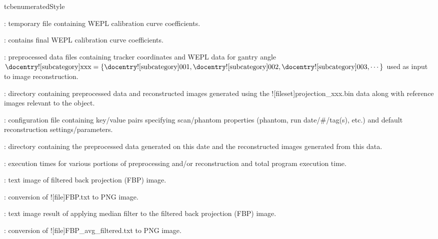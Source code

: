\begin{tcbenvironment}
\begin{tcbparbox}{tcbenumeratedStyle}
\begin{ThinEnum}
\begin{ThinEnum}
\begin{ThinEnum}
\begin{ThinEnum}
\begin{ThinEnum}
\begin{ThinEnum}
\begin{ThinEnum}
                        \item {} : temporary file containing WEPL calibration curve coefficients.
                                    \item {} : contains final WEPL calibration curve coefficients.
                                    \item {} : preprocessed data files containing tracker coordinates and WEPL data for gantry angle $\text{\docentry![subcategory]{xxx}} =\{\text{\docentry![subcategory]{001}}, \text{\docentry![subcategory]{002}}, \text{\docentry![subcategory]{003}}, \cdots\}$ used as input to image reconstruction.
                        \item {} : directory containing preprocessed data and reconstructed images generated using the \docentry![fileset]{projection\_xxx.bin} data along with reference images relevant to the object.
                                    \begin{ThinEnum}
                                        \item {} : configuration file containing key/value pairs specifying scan/phantom properties (phantom, run date/\#/tag(s), etc.) and default reconstruction settings/parameters.
                                    \item {} : directory containing the preprocessed data generated on this date and the reconstructed images generated from this data.
                                    \begin{ThinEnum}
                                            \item {} : execution times for various portions of preprocessing and/or reconstruction and total program execution time.
                                            \item {} : text image of filtered back projection (FBP) image.
                                            \item {} : conversion of \docentry![file]{FBP.txt} to PNG image.
                                            \item {} : text image result of applying median filter to the filtered back projection (FBP) image.
                                            \item {} : conversion of \docentry![file]{FBP\_avg\_filtered.txt} to PNG image.

\end{ThinEnum}
\end{ThinEnum}
\end{ThinEnum}
\end{ThinEnum}
\end{ThinEnum}
\end{ThinEnum}
\end{ThinEnum}
\end{ThinEnum}
\end{ThinEnum}
\end{tcbparbox}
\end{tcbenvironment}
